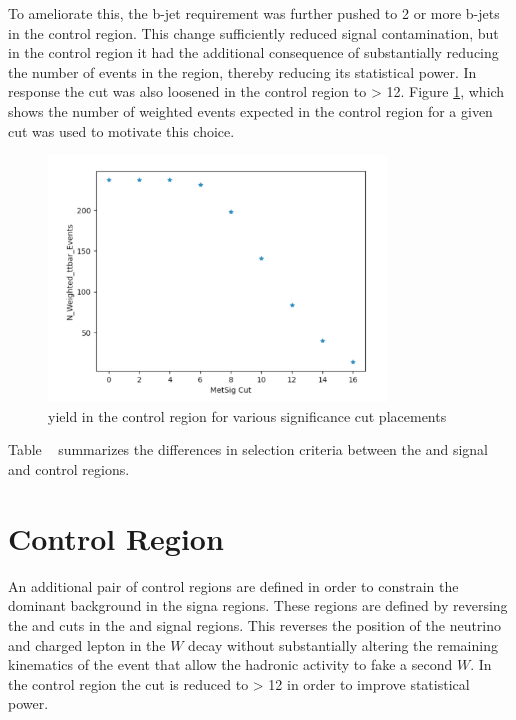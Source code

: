 To ameliorate this, the b-jet requirement was further pushed to 2 or more b-jets in the control region. This change sufficiently reduced signal contamination, but in the \merged control region it had the additional consequence of substantially reducing the number of events in the region, thereby reducing its statistical power.  In response the \metsig cut was also loosened in the \merged \ttbar control region to \metsig > 12. Figure \ref{fig:ttbar_metsig_placement}, which shows the number of weighted \ttbar events expected in the \merged control region for a given \metsig cut was used to motivate this choice.

\begin{figure}[htbp]
    \centering
       \includegraphics[width = 0.80\textwidth]{figures/4/ttbarCR/ttbar_metsig_placement.png}
       \caption{\ttbar yield in the \merged \ttbar control region for various \met significance cut placements}
       \label{fig:ttbar_metsig_placement}
\end{figure}

Table ~ summarizes the differences in selection criteria between the \merged and \resolved signal and \ttbar control regions.

\section{\wjets Control Region}
An additional pair of control regions are defined in order to constrain the dominant \wjets background in the signa regions. These regions are defined by reversing the \drTARl and \drWl cuts in the \merged and \resolved signal regions. This reverses the position of the neutrino and charged lepton in the $W$ decay without substantially altering the remaining kinematics of the event that allow the hadronic activity to fake a second $W$. In the \merged \wjets control region the \metsig cut is reduced to \metsig > 12 in order to improve statistical power.

